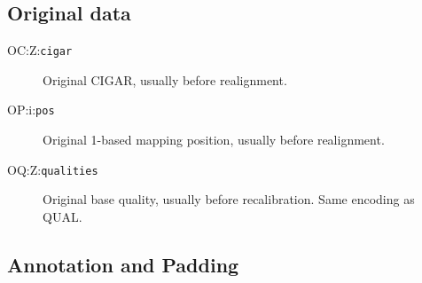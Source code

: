\documentclass[10pt]{article}
\newcommand{\tagvalue}[1]{\tt #1}
\begin{document}
\subsection{Original data}

\begin{description}
\item[OC:Z:\tagvalue{cigar}]
Original CIGAR, usually before realignment.

\item[OP:i:\tagvalue{pos}]
Original 1-based mapping position, usually before realignment.

\item[OQ:Z:\tagvalue{qualities}]
Original base quality, usually before recalibration.
Same encoding as {\sf QUAL}.
\end{description}

\subsection{Annotation and Padding}
\end{document}
